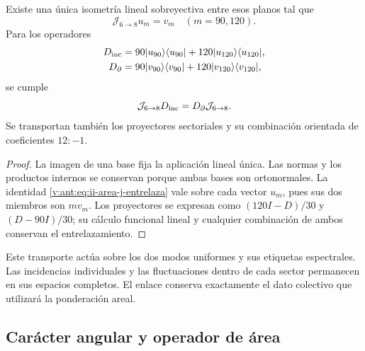 \begin{theorem}
\label{v:ant:thm:ii-area-entrelazamiento-colectivo}
Existe una única isometría lineal sobreyectiva entre esos planos tal que
\begin{equation}
 \mathcal J_{6\to8}u_m=v_m\quad(m=90,120).
 \label{v:ant:eq:ii-area-j-colectivo}
\end{equation}
Para los operadores
\[
 \begin{aligned}
 D_{\rm inc}&=90|u_{90}\rangle\langle u_{90}|
             +120|u_{120}\rangle\langle u_{120}|,\\
 D_\partial&=90|v_{90}\rangle\langle v_{90}|
             +120|v_{120}\rangle\langle v_{120}|,
 \end{aligned}
\]
se cumple
\begin{equation}
 \mathcal J_{6\to8}D_{\rm inc}
 =D_\partial\mathcal J_{6\to8}.
 \label{v:ant:eq:ii-area-j-entrelaza}
\end{equation}
Se transportan también los proyectores sectoriales y su combinación
orientada de coeficientes \(12:-1\).
\end{theorem}
\begin{proof}
La imagen de una base fija la aplicación lineal única. Las normas y los
productos internos se conservan porque ambas bases son ortonormales.
La identidad \eqref{v:ant:eq:ii-area-j-entrelaza} vale sobre cada vector
\(u_m\), pues sus dos miembros son \(m v_m\). Los proyectores se
expresan como \((120I-D)/30\) y \((D-90I)/30\); su cálculo funcional
lineal y cualquier combinación de ambos conservan el entrelazamiento.
\end{proof}

Este transporte actúa sobre los dos modos uniformes y sus etiquetas
espectrales. Las incidencias individuales y las fluctuaciones dentro de
cada sector permanecen en sus espacios completos. El enlace conserva
exactamente el dato colectivo que utilizará la ponderación areal.

\subsection{Carácter angular y operador de área}
\label{v:ant:sec:ii-area-caracter}

